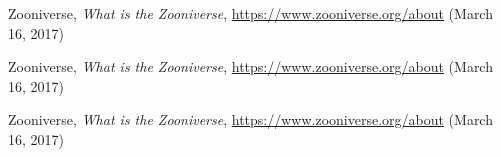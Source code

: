 \begin{thebibliography}{99}
\singlespace\normalsize


    Zooniverse, 
    \textit{What is the Zooniverse}, \url{https://www.zooniverse.org/about} 
    (March 16, 2017) 

    Zooniverse, 
    \textit{What is the Zooniverse}, \url{https://www.zooniverse.org/about} 
    (March 16, 2017)
    
    Zooniverse, 
    \textit{What is the Zooniverse}, \url{https://www.zooniverse.org/about} 
    (March 16, 2017)


\end{thebibliography}

